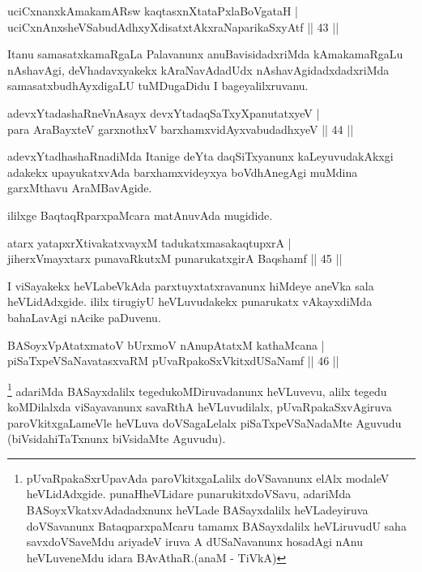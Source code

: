 \begin{shl}
uciCxnanxkAmakamAR\s sw kaqtasxnXtataPxlaBoVgataH |\\
uciCxnAnxsheVSabudAdhxyXdisatxtAkxraNaparikaSxyAtf \hfill || 43 ||
\end{shl}

\begin{artha}
Itanu samasatxkamaRgaLa Palavanunx anuBavisidadxriMda kAmakamaRgaLu nAshavAgi, deVhadavxyakekx kAraNavAdadUdx nAshavAgidadxdadxriMda samasatxbudhAyxdigaLU tuMDugaDidu  I bageyalilxruvanu.
\end{artha}

\begin{shl}
adevxYtadashaRneVnAsayx devxYtadaqSaTxyXpanutatxyeV |\\
para AraBayxteV garxnothxV barxhamxvidAyxvabudadhxyeV \hfill || 44 ||
\end{shl}

\begin{artha}
adevxYtadhashaRnadiMda Itanige deYta daqSiTxyanunx kaLeyuvudakAkxgi adakekx upayukatxvAda barxhamxvideyxya boVdhAnegAgi muMdina garxMthavu AraMBavAgide.
\end{artha}

\begin{center}
ililxge BaqtaqRparxpaMcara matAnuvAda mugidide.
\end{center}


\begin{shl}
atarx yatapxrXtivakatxvayxM tadukatxmasakaqtupxrA |\\
jiherxVmayxtarx punavaRkutxM punarukatxgirA Baqshamf \hfill || 45 ||
\end{shl}

\begin{artha}
I viSayakekx heVLabeVkAda parxtuyxtatxravanunx hiMdeye aneVka sala heVLidAdxgide. ililx 
tirugiyU heVLuvudakekx punarukatx vAkayxdiMda bahaLavAgi nAcike paDuvenu.
\end{artha}
	
\begin{shl}
BASoyxVpAtatxmatoV bUrxmoV nAnupAtatxM kathaMcana |\\
piSaTxpeVSaNavatasxvaRM pUvaRpakoSxVkitxdUSaNamf \hfill || 46 ||
\end{shl}

\begin{artha}
\footnote{pUvaRpakaSxrUpavAda paroVkitxgaLalilx doVSavanunx elAlx modaleV heVLidAdxgide. punaHheVLidare punarukitxdoVSavu, adariMda BASoyxVkatxvAdadadxnunx heVLade BASayxdalilx heVLadeyiruva doVSavanunx BataqparxpaMcaru tamamx BASayxdalilx heVLiruvudU saha savxdoVSaveMdu ariyadeV iruva A dUSaNavanunx hosadAgi nAnu heVLuveneMdu idara BAvAthaR.(anaM - TiVkA)} adariMda BASayxdalilx tegedukoMDiruvadanunx heVLuvevu, alilx tegedu koMDilalxda viSayavanunx savaRthA heVLuvudilalx, pUvaRpakaSxvAgiruva paroVkitxgaLameVle heVLuva doVSagaLelalx piSaTxpeVSaNadaMte Aguvudu (biVsidahiTaTxnunx biVsidaMte Aguvudu).
\end{artha}

